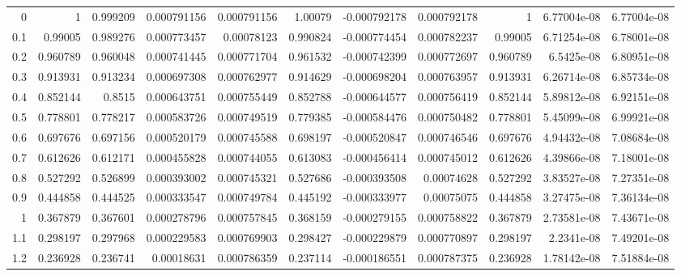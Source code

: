 {\begin{tabular}{rrrrrrrrrrr}
  0 & 1          & 0.999209   &   0.000791156 &   0.000791156 & 1.00079    &  -0.000792178 &   0.000792178 & 1          &   6.77004e-08 &   6.77004e-08 \\
  0.1         & 0.99005    & 0.989276   &   0.000773457 &   0.00078123  & 0.990824   &  -0.000774454 &   0.000782237 & 0.99005    &   6.71254e-08 &   6.78001e-08 \\
  0.2         & 0.960789   & 0.960048   &   0.000741445 &   0.000771704 & 0.961532   &  -0.000742399 &   0.000772697 & 0.960789   &   6.5425e-08  &   6.80951e-08 \\
  0.3         & 0.913931   & 0.913234   &   0.000697308 &   0.000762977 & 0.914629   &  -0.000698204 &   0.000763957 & 0.913931   &   6.26714e-08 &   6.85734e-08 \\
  0.4         & 0.852144   & 0.8515     &   0.000643751 &   0.000755449 & 0.852788   &  -0.000644577 &   0.000756419 & 0.852144   &   5.89812e-08 &   6.92151e-08 \\
  0.5         & 0.778801   & 0.778217   &   0.000583726 &   0.000749519 & 0.779385   &  -0.000584476 &   0.000750482 & 0.778801   &   5.45099e-08 &   6.99921e-08 \\
  0.6         & 0.697676   & 0.697156   &   0.000520179 &   0.000745588 & 0.698197   &  -0.000520847 &   0.000746546 & 0.697676   &   4.94432e-08 &   7.08684e-08 \\
  0.7         & 0.612626   & 0.612171   &   0.000455828 &   0.000744055 & 0.613083   &  -0.000456414 &   0.000745012 & 0.612626   &   4.39866e-08 &   7.18001e-08 \\
  0.8         & 0.527292   & 0.526899   &   0.000393002 &   0.000745321 & 0.527686   &  -0.000393508 &   0.00074628  & 0.527292   &   3.83527e-08 &   7.27351e-08 \\
  0.9         & 0.444858   & 0.444525   &   0.000333547 &   0.000749784 & 0.445192   &  -0.000333977 &   0.00075075  & 0.444858   &   3.27475e-08 &   7.36134e-08 \\
  1           & 0.367879   & 0.367601   &   0.000278796 &   0.000757845 & 0.368159   &  -0.000279155 &   0.000758822 & 0.367879   &   2.73581e-08 &   7.43671e-08 \\
  1.1         & 0.298197   & 0.297968   &   0.000229583 &   0.000769903 & 0.298427   &  -0.000229879 &   0.000770897 & 0.298197   &   2.2341e-08  &   7.49201e-08 \\
  1.2         & 0.236928   & 0.236741   &   0.00018631  &   0.000786359 & 0.237114   &  -0.000186551 &   0.000787375 & 0.236928   &   1.78142e-08 &   7.51884e-08 \\

\end{tabular}}
